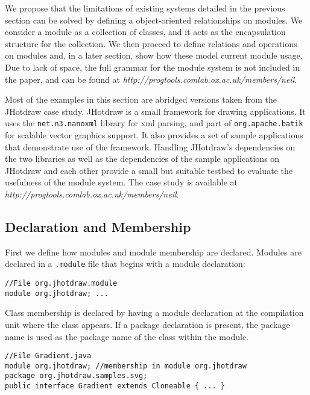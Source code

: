 
We propose that the limitations of existing systems detailed in the previous section
can be solved by defining a object-oriented relationships on modules. 
We consider a module as a collection of classes, and it acts as the encapsulation
structure for the collection. We then proceed to define
relations and operations on modules and, in a later section, show how
these model current module usage. Due to lack of space, the full grammar for
the module system is not included in the paper, and can be found at
\textit{http://progtools.comlab.ox.ac.uk/members/neil}.

Most of the examples in this section are abridged versions taken from the JHotdraw case study. 
JHotdraw\cite{jhotdraw} is a small framework for drawing applications. It
uses the \texttt{net.n3.nanoxml} library for xml parsing, and part of 
\texttt{org.apache.batik} for scalable vector graphics support. It also
provides a set of sample applications that demonstrate use of the framework.
Handling JHotdraw's dependencies on the two libraries as well as the dependencies
of the sample applications on JHotdraw and each other provide a small but
suitable testbed to evaluate the usefulness of the module system.
The case study is available at \textit{http://progtools.comlab.ox.ac.uk/members/neil}. 

\subsection{Declaration and Membership}

First we define how modules and module membership are declared. 
Modules are declared in a {\tt .module} file that begins with a module
declaration:

\begin{lstlisting}
//File org.jhotdraw.module
module org.jhotdraw; ...
\end{lstlisting}

Class membership is declared by having a module declaration at the compilation unit where 
the class appears.  If a package declaration is present, 
the package name is used as the package name of the class within the module.

\begin{lstlisting}
//File Gradient.java
module org.jhotdraw; //membership in module org.jhotdraw
package org.jhotdraw.samples.svg;
public interface Gradient extends Cloneable { ... }
\end{lstlisting}

